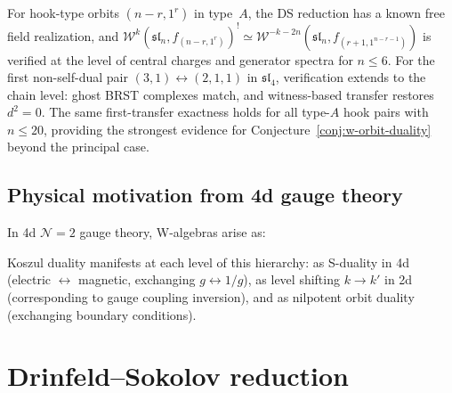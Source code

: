 \begin{remark}
\label{rem:hook-type-evidence}
For hook-type orbits $(n-r,1^r)$ in type~$A$, the DS reduction has a known free field realization, and $\mathcal{W}^k(\mathfrak{sl}_n, f_{(n-r,1^r)})^! \simeq \mathcal{W}^{-k-2n}(\mathfrak{sl}_n, f_{(r+1,1^{n-r-1})})$ is verified at the level of central charges and generator spectra for $n \leq 6$.  For the first non-self-dual pair $(3,1) \leftrightarrow (2,1,1)$ in $\mathfrak{sl}_4$, verification extends to the chain level: ghost BRST complexes match, and witness-based transfer restores $d^2 = 0$.  The same first-transfer exactness holds for all type-$A$ hook pairs with $n \leq 20$, providing the strongest evidence for Conjecture~\ref{conj:w-orbit-duality} beyond the principal case.
\end{remark}

\subsection{Physical motivation from 4d gauge theory}

\begin{remark}
In 4d $\mathcal{N}=2$ gauge theory, W-algebras arise as:
\begin{center}
\end{center}

Koszul duality manifests at each level of this hierarchy: as S-duality in 4d (electric $\leftrightarrow$ magnetic, exchanging $g \leftrightarrow 1/g$), as level shifting $k \to k'$ in 2d (corresponding to gauge coupling inversion), and as nilpotent orbit duality (exchanging boundary conditions).
\end{remark}

\section{Drinfeld--Sokolov reduction}

